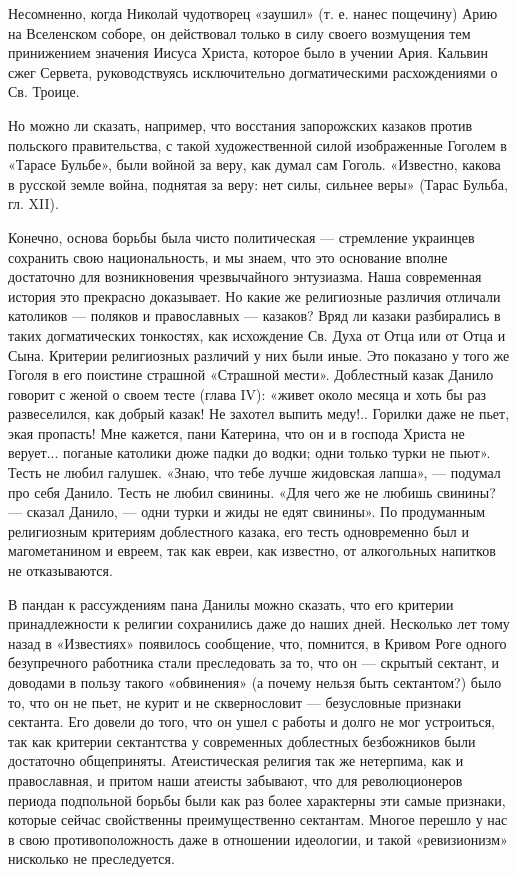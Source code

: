 Несомненно, когда Николай чудотворец «заушил» (т. е. нанес пощечину) Арию на
Вселенском соборе, он действовал только в силу своего возмущения тем
принижением значения Иисуса Христа, которое было в учении Ария. Кальвин сжег
Сервета, руководствуясь исключительно догматическими расхождениями о Св.
Троице.

Но можно ли сказать, например, что восстания запорожских казаков против
польского правительства, с такой художественной силой изображенные Гоголем в
«Тарасе Бульбе», были войной за веру, как думал сам Гоголь. «Известно, какова в
русской земле война, поднятая за веру: нет силы, сильнее веры» (Тарас Бульба,
гл. XII).

Конечно, основа борьбы была чисто политическая --- стремление украинцев сохранить
свою национальность, и мы знаем, что это основание вполне достаточно для
возникновения чрезвычайного энтузиазма. Наша современная история это прекрасно
доказывает. Но какие же религиозные различия отличали католиков --- поляков и
православных --- казаков? Вряд ли казаки разбирались в таких догматических
тонкостях, как исхождение Св. Духа от Отца или от Отца и Сына. Критерии
религиозных различий у них были иные. Это показано у
того же Гоголя в его поистине страшной «Страшной мести». Доблестный казак
Данило говорит с женой о своем тесте (глава IV): «живет около месяца и хоть бы
раз развеселился, как добрый казак! Не захотел выпить меду!.. Горилки даже не
пьет, экая пропасть! Мне кажется, пани Катерина, что он и в господа Христа не
верует... поганые католики дюже падки до водки; одни только турки не пьют».
Тесть не любил галушек. «Знаю, что тебе лучше жидовская лапша», --- подумал про
себя Данило. Тесть не любил свинины. «Для чего же не любишь свинины? --- сказал
Данило, --- одни турки и жиды не едят свинины». По продуманным религиозным
критериям доблестного казака, его тесть одновременно был и магометанином и
евреем, так как евреи, как известно, от алкогольных напитков не отказываются.

В пандан к рассуждениям пана Данилы можно сказать, что его критерии
принадлежности к религии сохранились даже до наших дней. Несколько лет тому
назад в «Известиях» появилось сообщение, что, помнится, в Кривом Роге одного
безупречного работника стали преследовать за то, что он --- скрытый сектант, и
доводами в пользу такого «обвинения» (а почему нельзя быть сектантом?) было то,
что он не пьет, не курит и не сквернословит --- безусловные признаки сектанта.
Его довели до того, что он ушел с работы и долго не мог устроиться, так как
критерии сектантства у современных доблестных безбожников были достаточно
общеприняты. Атеистическая религия так же нетерпима, как и православная, и
притом наши атеисты забывают, что для революционеров периода подпольной борьбы
были как раз более характерны эти самые признаки, которые сейчас свойственны
преимущественно сектантам. Многое перешло у нас в свою противоположность даже в
отношении идеологии, и такой «ревизионизм» нисколько не преследуется.

